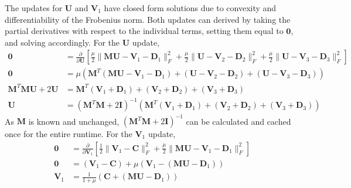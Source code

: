 The updates for $\mathbf{U}$ and $\mathbf{V}_1$ have closed form solutions due to convexity and differentiability of the Frobenius norm. Both updates can derived by taking the partial derivatives with respect to the individual terms, setting them equal to $\mathbf{0}$, and solving accordingly. For the $\mathbf{U}$ update,
\begin{equation*}
  \begin{aligned}
    \mathbf{0} &= \frac{\partial}{\partial \mathbf{U}}\left[\frac{\mu}{2} \|\mathbf{MU} - \mathbf{V}_1 - \mathbf{D}_1\|_F^2  + \frac{\mu}{2} \|\mathbf{U} - \mathbf{V}_2 - \mathbf{D}_2\|_F^2  + \frac{\mu}{2} \|\mathbf{U} - \mathbf{V}_3 - \mathbf{D}_3\|_F^2\right]
    \\
    \mathbf{0} &= \mu \left(\mathbf{M}^T(\mathbf{MU}-\mathbf{V}_1-\mathbf{D}_1) + (\mathbf{U}-\mathbf{V}_2-\mathbf{D}_2) + (\mathbf{U}-\mathbf{V}_3-\mathbf{D}_3)\right)
    \\
    \mathbf{M}^T\mathbf{MU} + 2\mathbf{U} &= \mathbf{M}^T(\mathbf{V}_1+\mathbf{D}_1) + (\mathbf{V}_2+\mathbf{D}_2) + (\mathbf{V}_3+\mathbf{D}_3)
    \\
    \mathbf{U} &= (\mathbf{M}^T \mathbf{M} + 2\mathbf{I})^{-1}(\mathbf{M}^T(\mathbf{V}_1+\mathbf{D}_1) + (\mathbf{V}_2+\mathbf{D}_2) + (\mathbf{V}_3+\mathbf{D}_3)) 
  \end{aligned}
\end{equation*}
As $\mathbf{M}$ is known and unchanged, $(\mathbf{M}^T \mathbf{M} + 2\mathbf{I})^{-1}$ can be calculated and cached once for the entire runtime. For the $\mathbf{V}_1$ update,
$$
\begin{aligned}
   \mathbf{0} &= \frac{\partial}{\partial \mathbf{V}_1} \left[ \frac{1}{2}\|\mathbf{V}_1-\mathbf{C}\|_F^2 + \frac{\mu}{2} \|\mathbf{MU} - \mathbf{V}_1 - \mathbf{D}_1 \|_F^2 \right]
  \\
  \mathbf{0} &= (\mathbf{V}_1 - \mathbf{C}) + \mu(\mathbf{V}_1 - (\mathbf{MU} - \mathbf{D}_1))
  \\
  \mathbf{V}_1 &= \frac{1}{1+\mu} \left(\mathbf{C} + (\mathbf{MU} - \mathbf{D}_1)\right) 
\end{aligned}
$$

